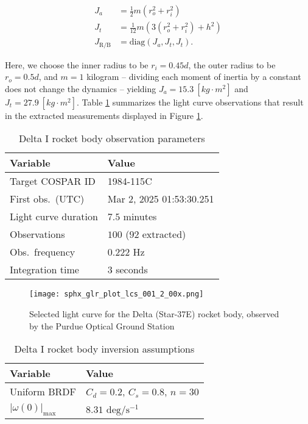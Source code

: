 \documentclass[a4paper,twocolumn]{spaceDebrisC} %
\newcommand{\figbig}[0]{0.5\textwidth}
\begin{document}
\begin{align}
 J_a &= \frac{1}{2} m \left(r_o^2+r_i^2\right) \\
 J_t &= \frac{1}{12} m \left(3 \left(r_o^2+r_i^2\right) + h^2\right) \\
 J_\text{R/B} &= \text{diag} \left(J_a, J_t, J_t\right).
\end{align}

Here, we choose the inner radius to be $r_i=0.45d$, the outer radius to be $r_o=0.5d$, and $m=1$ kilogram -- dividing each moment of inertia by a constant does not change the dynamics -- yielding $J_a = 15.3 \: [kg \cdot m^2]$ and $J_t = 27.9 \: [kg \cdot m^2]$. Table \ref{tb:case1_in} summarizes the light curve observations that result in the extracted measurements displayed in Figure \ref{fig:rb_lc_obs}.

\begin{table}[ht]
  \centering
  \caption{Delta I rocket body observation parameters}
  \vspace*{6pt}
  \begin{tabular}{|l|l|}
  \hline
  \textbf{Variable} & \textbf{Value} \\ \hline
  Target COSPAR ID & 1984-115C \\ \hline
  First obs.\ (UTC) & Mar 2, 2025 01:53:30.251 \\ \hline
  Light curve duration & $7.5$ minutes \\ \hline
  Observations & $100$ ($92$ extracted) \\ \hline
  Obs.\ frequency & $0.222$ Hz \\ \hline
  Integration time & $3$ seconds \\ \hline
  \end{tabular}
  \label{tb:case1_in}
\end{table}

\begin{figure}[ht]
  \centering
  \texttt{[image: sphx\_glr\_plot\_lcs\_001\_2\_00x.png]}
  \caption{Selected light curve for the Delta (Star-37E) rocket body, observed by the Purdue Optical Ground Station}
  \label{fig:rb_lc_obs}
\end{figure}

\begin{table}[ht]
  \centering
  \caption{Delta I rocket body inversion assumptions}
  \vspace*{6pt}
  \begin{tabular}{|l|l|}
  \hline
  \textbf{Variable} & \textbf{Value} \\ \hline
  Uniform BRDF & $C_d=0.2$, $C_s=0.8$, $n=30$ \\ \hline
  $|\omega(0)|_\text{max}$ & $8.31$ $\text{deg} / \text{s}^{-1}$ \\ \hline
  \end{tabular}
  \label{tb:case1_ass}
\end{table}
\end{document}
